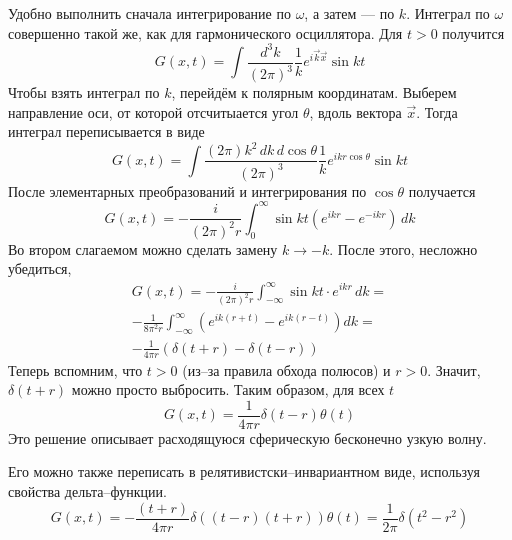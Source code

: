 \documentclass{article}
\begin{document}
Удобно выполнить сначала интегрирование по $\omega$, а затем --- по $k$. 
Интеграл по $\omega$ совершенно такой же, как для гармонического осциллятора.  Для $t > 0$
получится
\begin{equation}
    G(x,t) = \int \frac{d^3 k}{(2\pi)^3} 
            \frac{1}{k} e^{i\vec{k}\vec{x}} \sin{kt}
\end{equation}
Чтобы взять интеграл по $k$, перейдём к полярным координатам. Выберем направление оси, от
которой отсчитыается угол $\theta$, вдоль вектора $\vec{x}$. Тогда интеграл переписывается
в виде
\begin{equation}
    G(x,t) = \int \frac{(2\pi) k^2\,dk\,d\cos{\theta}}{(2\pi)^3} 
            \frac{1}{k}e^{ikr \cos{\theta}}\sin{kt}
\end{equation}
После элементарных преобразований и интегрирования по $\cos{\theta}$ получается
\begin{equation}
    G(x,t) = -\frac{i}{(2\pi)^2 r} \int_0^{\infty} \sin{kt} (e^{ikr} - e^{-ikr}) \,dk
\end{equation}
Во втором слагаемом можно сделать замену $k \to -k$. После этого, несложно убедиться,
\begin{multline}
    G(x,t) = -\frac{i}{(2\pi)^2 r} \int_{-\infty}^{\infty} \sin{kt}\cdot e^{ikr} \,dk = \\
        -\frac{1}{8\pi^2 r} \int_{-\infty}^{\infty} (e^{ik(r+t)} - e^{ik(r-t)}) dk = \\
        -\frac{1}{4\pi r} (\delta(t + r) - \delta(t - r))
\end{multline}
Теперь вспомним, что $t > 0$ (из--за правила обхода полюсов) и $r > 0$. Значит, 
$\delta(t + r)$ можно просто выбросить. Таким образом, для всех $t$
\begin{equation}
    G(x,t) = \frac{1}{4\pi r} \delta(t - r)\theta(t)
\end{equation}
Это решение описывает расходящуюся сферическую бесконечно узкую волну. 

Его можно также переписать в релятивистски--инвариантном виде, используя свойства
дельта--функции.
\begin{equation}
    G(x,t) = -\frac{(t + r)}{4\pi r} \delta((t - r)(t + r)) \theta(t) = 
        \frac{1}{2\pi} \delta(t^2 - r^2)
\end{equation}
\end{document}
